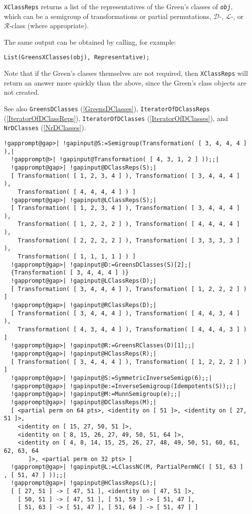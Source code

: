 \documentclass[a4paper,11pt]{report}
\begin{document}
{{{ \texttt{XClassReps} returns a list of the representatives of the Green's classes of \mbox{\texttt{\mdseries\slshape obj}}, which can be a semigroup of transformations or partial permutations, $\mathcal{D}$-, $\mathcal{L}$-, or $\mathcal{R}$-class (where appropriate).

 The same output can be obtained by calling, for example: 
\begin{Verbatim}[commandchars=!@|,fontsize=\small,frame=single,label=Example]
  List(GreensXClasses(obj), Representative);
\end{Verbatim}
 Note that if the Green's classes themselves are not required, then \texttt{XClassReps} will return an answer more quickly than the above, since the Green's class
objects are not created.

 See also \texttt{GreensDClasses} (\ref{GreensDClasses}), \texttt{IteratorOfDClassReps} (\ref{IteratorOfDClassReps}), \texttt{IteratorOfDClasses} (\ref{IteratorOfDClasses}), and \texttt{NrDClasses} (\ref{NrDClasses}). 
\begin{Verbatim}[commandchars=!@|,fontsize=\small,frame=single,label=Example]
  !gapprompt@gap>| !gapinput@S:=Semigroup(Transformation( [ 3, 4, 4, 4 ] ),|
  !gapprompt@>| !gapinput@Transformation( [ 4, 3, 1, 2 ] ));;|
  !gapprompt@gap>| !gapinput@DClassReps(S);|
  [ Transformation( [ 1, 2, 3, 4 ] ), Transformation( [ 3, 4, 4, 4 ] ), 
    Transformation( [ 4, 4, 4, 4 ] ) ]
  !gapprompt@gap>| !gapinput@LClassReps(S);|
  [ Transformation( [ 1, 2, 3, 4 ] ), Transformation( [ 3, 4, 4, 4 ] ), 
    Transformation( [ 1, 2, 2, 2 ] ), Transformation( [ 4, 4, 4, 4 ] ), 
    Transformation( [ 2, 2, 2, 2 ] ), Transformation( [ 3, 3, 3, 3 ] ), 
    Transformation( [ 1, 1, 1, 1 ] ) ]
  !gapprompt@gap>| !gapinput@D:=GreensDClasses(S)[2];|
  {Transformation( [ 3, 4, 4, 4 ] )}
  !gapprompt@gap>| !gapinput@LClassReps(D);|
  [ Transformation( [ 3, 4, 4, 4 ] ), Transformation( [ 1, 2, 2, 2 ] ) ]
  !gapprompt@gap>| !gapinput@RClassReps(D);|
  [ Transformation( [ 3, 4, 4, 4 ] ), Transformation( [ 4, 4, 3, 4 ] ), 
    Transformation( [ 4, 3, 4, 4 ] ), Transformation( [ 4, 4, 4, 3 ] ) ]
  !gapprompt@gap>| !gapinput@R:=GreensRClasses(D)[1];;|
  !gapprompt@gap>| !gapinput@HClassReps(R);|
  [ Transformation( [ 3, 4, 4, 4 ] ), Transformation( [ 1, 2, 2, 2 ] ) ]
  !gapprompt@gap>| !gapinput@S:=SymmetricInverseSemigp(6);;|
  !gapprompt@gap>| !gapinput@e:=InverseSemigroup(Idempotents(S));;|
  !gapprompt@gap>| !gapinput@M:=MunnSemigroup(e);;|
  !gapprompt@gap>| !gapinput@DClassReps(M);|
  [ <partial perm on 64 pts>, <identity on [ 51 ]>, <identity on [ 27, 51 ]>, 
    <identity on [ 15, 27, 50, 51 ]>, 
    <identity on [ 8, 15, 26, 27, 49, 50, 51, 64 ]>, 
    <identity on [ 4, 8, 14, 15, 25, 26, 27, 48, 49, 50, 51, 60, 61, 62, 63, 64 
       ]>, <partial perm on 32 pts> ]
  !gapprompt@gap>| !gapinput@L:=LClassNC(M, PartialPermNC( [ 51, 63 ] , [ 51, 47 ] ));;|
  !gapprompt@gap>| !gapinput@HClassReps(L);|
  [ [ 27, 51 ] -> [ 47, 51 ], <identity on [ 47, 51 ]>, 
    [ 50, 51 ] -> [ 47, 51 ], [ 51, 59 ] -> [ 51, 47 ], 
    [ 51, 63 ] -> [ 51, 47 ], [ 51, 64 ] -> [ 51, 47 ] ]
\end{Verbatim}
 }

}}
\end{document}
